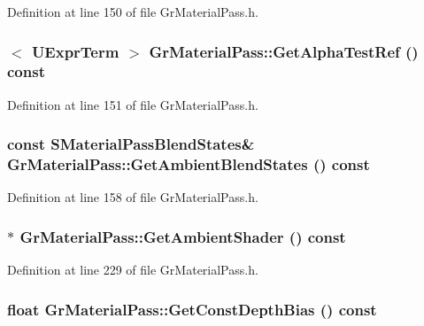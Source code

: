 Definition at line 150 of file GrMaterialPass.h.\hypertarget{class_gr_material_pass_a4a289c7731127effe76a46eaf255fc6}{
\subsubsection[{GetAlphaTestRef}]{$<$ {\bf UExprTerm} $>$ GrMaterialPass::GetAlphaTestRef () const}}
\label{class_gr_material_pass_a4a289c7731127effe76a46eaf255fc6}




Definition at line 151 of file GrMaterialPass.h.\hypertarget{class_gr_material_pass_931b56341af762712eec766d2be3caab}{
\subsubsection[{GetAmbientBlendStates}]{\setlength{\rightskip}{0pt plus 5cm}const {\bf SMaterialPassBlendStates}\& GrMaterialPass::GetAmbientBlendStates () const}}
\label{class_gr_material_pass_931b56341af762712eec766d2be3caab}




Definition at line 158 of file GrMaterialPass.h.\hypertarget{class_gr_material_pass_4581e9b370422f95a8a7e9c8556d0e78}{
\subsubsection[{GetAmbientShader}]{$\ast$ GrMaterialPass::GetAmbientShader () const}}
\label{class_gr_material_pass_4581e9b370422f95a8a7e9c8556d0e78}




Definition at line 229 of file GrMaterialPass.h.\hypertarget{class_gr_material_pass_f36302b1ba423ef54654847d5e881c4b}{
\subsubsection[{GetConstDepthBias}]{\setlength{\rightskip}{0pt plus 5cm}float GrMaterialPass::GetConstDepthBias () const}}
\label{class_gr_material_pass_f36302b1ba423ef54654847d5e881c4b}




